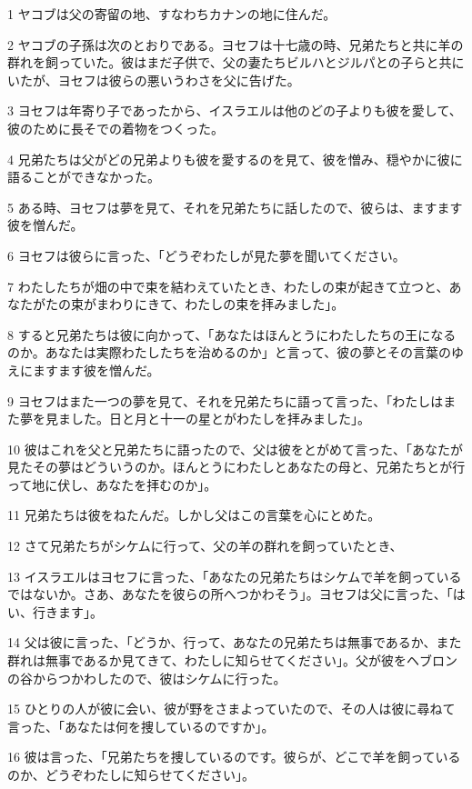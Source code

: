 \par 1 ヤコブは父の寄留の地、すなわちカナンの地に住んだ。
\par 2 ヤコブの子孫は次のとおりである。ヨセフは十七歳の時、兄弟たちと共に羊の群れを飼っていた。彼はまだ子供で、父の妻たちビルハとジルパとの子らと共にいたが、ヨセフは彼らの悪いうわさを父に告げた。
\par 3 ヨセフは年寄り子であったから、イスラエルは他のどの子よりも彼を愛して、彼のために長そでの着物をつくった。
\par 4 兄弟たちは父がどの兄弟よりも彼を愛するのを見て、彼を憎み、穏やかに彼に語ることができなかった。
\par 5 ある時、ヨセフは夢を見て、それを兄弟たちに話したので、彼らは、ますます彼を憎んだ。
\par 6 ヨセフは彼らに言った、「どうぞわたしが見た夢を聞いてください。
\par 7 わたしたちが畑の中で束を結わえていたとき、わたしの束が起きて立つと、あなたがたの束がまわりにきて、わたしの束を拝みました」。
\par 8 すると兄弟たちは彼に向かって、「あなたはほんとうにわたしたちの王になるのか。あなたは実際わたしたちを治めるのか」と言って、彼の夢とその言葉のゆえにますます彼を憎んだ。
\par 9 ヨセフはまた一つの夢を見て、それを兄弟たちに語って言った、「わたしはまた夢を見ました。日と月と十一の星とがわたしを拝みました」。
\par 10 彼はこれを父と兄弟たちに語ったので、父は彼をとがめて言った、「あなたが見たその夢はどういうのか。ほんとうにわたしとあなたの母と、兄弟たちとが行って地に伏し、あなたを拝むのか」。
\par 11 兄弟たちは彼をねたんだ。しかし父はこの言葉を心にとめた。
\par 12 さて兄弟たちがシケムに行って、父の羊の群れを飼っていたとき、
\par 13 イスラエルはヨセフに言った、「あなたの兄弟たちはシケムで羊を飼っているではないか。さあ、あなたを彼らの所へつかわそう」。ヨセフは父に言った、「はい、行きます」。
\par 14 父は彼に言った、「どうか、行って、あなたの兄弟たちは無事であるか、また群れは無事であるか見てきて、わたしに知らせてください」。父が彼をヘブロンの谷からつかわしたので、彼はシケムに行った。
\par 15 ひとりの人が彼に会い、彼が野をさまよっていたので、その人は彼に尋ねて言った、「あなたは何を捜しているのですか」。
\par 16 彼は言った、「兄弟たちを捜しているのです。彼らが、どこで羊を飼っているのか、どうぞわたしに知らせてください」。

